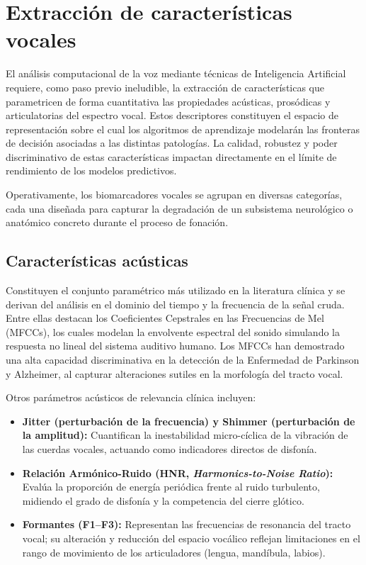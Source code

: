 \section{Extracción de características vocales}\label{sec:extraccion_caracteristicas}

El análisis computacional de la voz mediante técnicas de Inteligencia Artificial requiere, como paso previo ineludible, la extracción de características que parametricen de forma cuantitativa las propiedades acústicas, prosódicas y articulatorias del espectro vocal. Estos descriptores constituyen el espacio de representación sobre el cual los algoritmos de aprendizaje modelarán las fronteras de decisión asociadas a las distintas patologías. La calidad, robustez y poder discriminativo de estas características impactan directamente en el límite de rendimiento de los modelos predictivos.

Operativamente, los biomarcadores vocales se agrupan en diversas categorías, cada una diseñada para capturar la degradación de un subsistema neurológico o anatómico concreto durante el proceso de fonación.

\subsection{Características acústicas}\label{subsec:caracteristicas_acusticas}

Constituyen el conjunto paramétrico más utilizado en la literatura clínica y se derivan del análisis en el dominio del tiempo y la frecuencia de la señal cruda. Entre ellas destacan los Coeficientes Cepstrales en las Frecuencias de Mel (MFCCs), los cuales modelan la envolvente espectral del sonido simulando la respuesta no lineal del sistema auditivo humano. Los MFCCs han demostrado una alta capacidad discriminativa en la detección de la Enfermedad de Parkinson y Alzheimer, al capturar alteraciones sutiles en la morfología del tracto vocal.

Otros parámetros acústicos de relevancia clínica incluyen:
\begin{itemize}
    \item \textbf{Jitter (perturbación de la frecuencia) y Shimmer (perturbación de la amplitud):} Cuantifican la inestabilidad micro-cíclica de la vibración de las cuerdas vocales, actuando como indicadores directos de disfonía.
    \item \textbf{Relación Armónico-Ruido (HNR, \textit{Harmonics-to-Noise Ratio}):} Evalúa la proporción de energía periódica frente al ruido turbulento, midiendo el grado de disfonía y la competencia del cierre glótico.
    \item \textbf{Formantes (F1–F3):} Representan las frecuencias de resonancia del tracto vocal; su alteración y reducción del espacio vocálico reflejan limitaciones en el rango de movimiento de los articuladores (lengua, mandíbula, labios).
\end{itemize}

